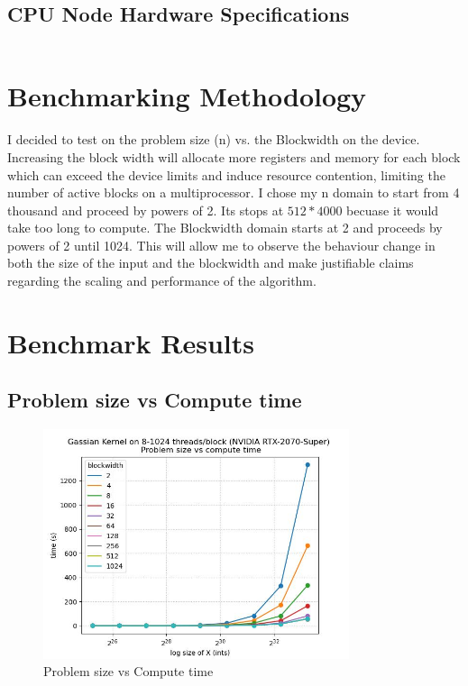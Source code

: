 \documentclass[11pt,a4paper]{article}
\begin{document}
\subsection{CPU Node Hardware Specifications}

\begin{lstlisting}

\end{lstlisting}

\section{Benchmarking Methodology}
I decided to test on the problem size (n) vs. the Blockwidth on the device. Increasing the block width will allocate more registers and memory for each block which can exceed the device limits and induce resource contention, limiting the number of active blocks on a multiprocessor. I chose my n domain to start from 4 thousand and proceed by powers of 2. Its stops at $512*4000$ becuase it would take too long to compute. The Blockwidth domain starts at 2 and proceeds by powers of 2 until 1024. This will allow me to observe the behaviour change in both the size of the input and the blockwidth and make justifiable claims regarding the scaling and performance of the algorithm.

\section{Benchmark Results}
\subsection{Problem size vs Compute time}
\begin{figure}[H]
  \includegraphics[width=0.8\textwidth]{"./experiment.jpg"}
  \caption{Problem size vs Compute time}
\end{figure}
\end{document}
